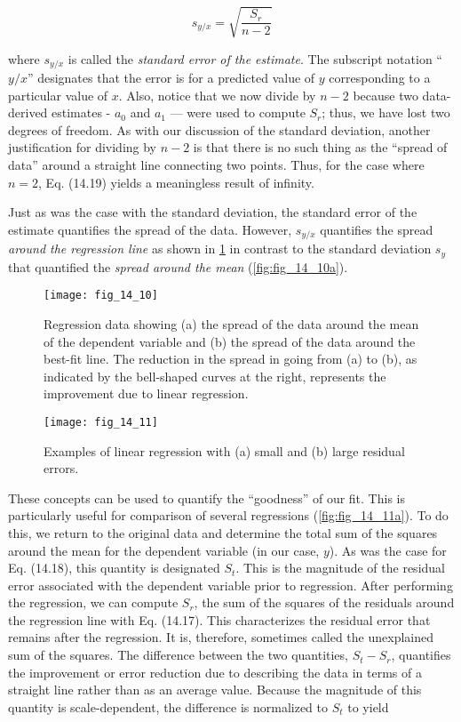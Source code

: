 \documentclass[../main.tex]{subfiles}
\begin{document}
\begin{equation}
	\tag{14.19}
	s_{y/x} = \sqrt{\frac{S_r}{n-2}}
\end{equation}

\noindent where $s_{y/x}$ is called the \textit{standard error of the estimate}. The subscript notation ``$y/x$'' designates that the error is for a predicted value of $y$ corresponding to a particular value of $x$.
Also, notice that we now divide by $n - 2$ because two data-derived estimates - $a_0$ and $a_1$ — were used to compute $S_r$; thus, we have lost two degrees of freedom. As with our discussion of the standard deviation, another justification for dividing by $n - 2$ is that there is no such thing as the ``spread of data'' around a straight line connecting two points. Thus, for the case where $n = 2$, Eq. (14.19) yields a meaningless result of infinity.

Just as was the case with the standard deviation, the standard error of the estimate quantifies the spread of the data. However, $s_{y/x}$ quantifies the spread \textit{around the regression line} as shown in \ref{fig:fig_14_10b} in contrast to the standard deviation $s_y$ that quantified the \textit{spread around the mean} (\ref{fig:fig_14_10a}).

\begin{figure}[H]
	\centering
	\texttt{[image: fig\_14\_10]}
	\caption{\textsf{Regression data showing (a) the spread of the data around the mean of the dependent variable and (b) the spread of the data around the best-fit line. The reduction in the spread in going from (a) to (b), as indicated by the bell-shaped curves at the right, represents the improvement due to linear regression.}}
	\label{fig:fig_14_10}
	\label{fig:fig_14_10a}
	\label{fig:fig_14_10b}
\end{figure}

\begin{figure}[H]
	\centering
	\texttt{[image: fig\_14\_11]}
	\caption{\textsf{Examples of linear regression with (a) small and (b) large residual errors.}}
	\label{fig:fig_14_11}
	\label{fig:fig_14_11a}
	\label{fig:fig_14_11b}
\end{figure}

These concepts can be used to quantify the ``goodness'' of our fit. This is particularly useful for comparison of several regressions (\ref{fig:fig_14_11a}). To do this, we return to the original data and determine the total sum of the squares around the mean for the dependent variable (in our case, $y$). As was the case for Eq. (14.18), this quantity is designated $S_t$. This is the magnitude of the residual error associated with the dependent variable prior to regression. After performing the regression, we can compute $S_r$, the sum of the squares of the residuals around the regression line with Eq. (14.17). This characterizes the residual error that remains after the regression. It is, therefore, sometimes called the unexplained sum of the squares. The difference between the two quantities, $S_t - S_r$, quantifies the improvement or error reduction due to describing the data in terms of a straight line rather than as an average value. Because the magnitude of this quantity is scale-dependent, the difference is normalized to $S_t$ to yield
\end{document}
